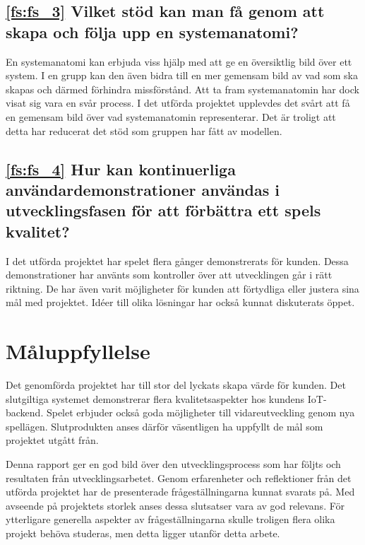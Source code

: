 \subsection*{\ref{fs:fs_3} Vilket stöd kan man få genom att skapa och följa upp en systemanatomi?}

En systemanatomi kan erbjuda viss hjälp med att ge en översiktlig bild över ett system. I en grupp kan den även bidra till en mer gemensam bild av vad som ska skapas och därmed förhindra missförstånd. Att ta fram systemanatomin har dock visat sig vara en svår process. I det utförda projektet upplevdes det svårt att få en gemensam bild över vad systemanatomin representerar. Det är troligt att detta har reducerat det stöd som gruppen har fått av modellen.

\subsection*{\ref{fs:fs_4} Hur kan kontinuerliga användardemonstrationer användas i utvecklingsfasen för att förbättra ett spels kvalitet?}

I det utförda projektet har spelet flera gånger demonstrerats för kunden. Dessa demonstrationer har använts som kontroller över att utvecklingen går i rätt riktning. De har även varit möjligheter för kunden att förtydliga eller justera sina mål med projektet. Idéer till olika lösningar har också kunnat diskuterats öppet.

\section{Måluppfyllelse}

Det genomförda projektet har till stor del lyckats skapa värde för kunden. Det slutgiltiga systemet demonstrerar flera kvalitetsaspekter hos kundens IoT-backend. Spelet erbjuder också goda möjligheter till vidareutveckling genom nya spellägen. Slutprodukten anses därför väsentligen ha uppfyllt de mål som projektet utgått från.

Denna rapport ger en god bild över den utvecklingsprocess som har följts och resultaten från utvecklingsarbetet. Genom erfarenheter och reflektioner från det utförda projektet har de presenterade frågeställningarna kunnat svarats på. Med avseende på projektets storlek anses dessa slutsatser vara av god relevans. För ytterligare generella aspekter av frågeställningarna skulle troligen flera olika projekt behöva studeras, men detta ligger utanför detta arbete.

